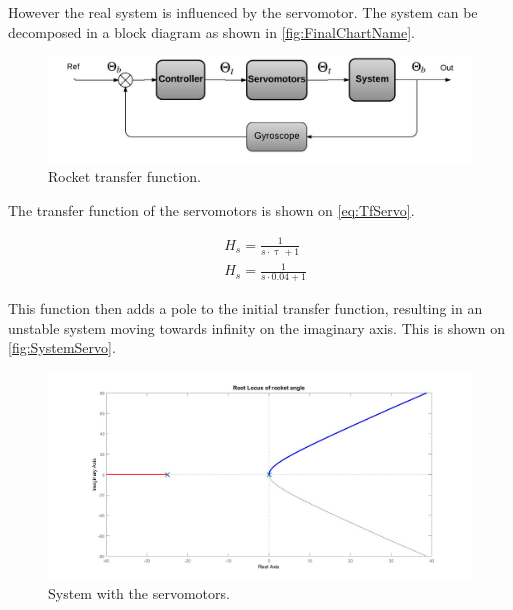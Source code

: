 However the real system is influenced by the servomotor. The system can be decomposed in a block diagram as shown in \autoref{fig:FinalChartName}.

\begin{figure}[htbp]
	\centering
	
	\includegraphics[width=\textwidth]{figures/Rocket/design/final_chart}
	\caption{Rocket transfer function.}
	\label{fig:FinalChartName}
	
\end{figure}

The transfer function of the servomotors is shown on \autoref{eq:TfServo}. 

\begin{subequations}
	\begin{flalign}
& H_s = \frac{1}{s \cdot \uptau + 1}	\\
& H_s = \frac{1}{s \cdot 0.04 + 1}
\label{eq:TfServo}
	\end{flalign}
\end{subequations}
\startexplain
{}
\stopexplain

This function then adds a pole to the initial transfer function, resulting in an unstable system moving towards infinity on the imaginary axis. This is shown on \autoref{fig:SystemServo}.
				
\begin{figure}[htbp]
	\centering
		\includegraphics[width=\textwidth]{figures/Rocket/design/tf_with_servo_vf}
		\caption{System with the servomotors.}
		\label{fig:SystemServo}
\end{figure}

